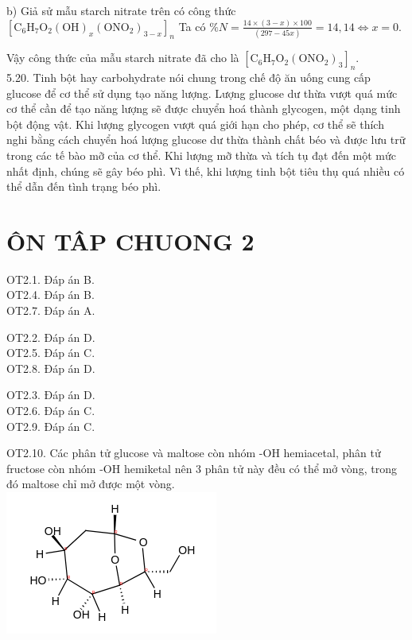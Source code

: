 \documentclass[10pt]{article}
\begin{document}
b) Giả sử mẫu starch nitrate trên có công thức $\left[\mathrm{C}_{6} \mathrm{H}_{7} \mathrm{O}_{2}(\mathrm{OH})_{x}\left(\mathrm{ONO}_{2}\right)_{3-x}\right]_{n}$ Ta có $\% N=\frac{14 \times(3-x) \times 100}{(297-45 x)}=14,14 \Leftrightarrow x=0$.

Vậy công thức của mẫu starch nitrate đã cho là $\left[\mathrm{C}_{6} \mathrm{H}_{7} \mathrm{O}_{2}\left(\mathrm{ONO}_{2}\right)_{3}\right]_{n}$.\\
5.20. Tinh bột hay carbohydrate nói chung trong chế độ ăn uống cung cấp glucose để cơ thể sử dụng tạo năng lượng. Lượng glucose dư thừa vượt quá mức cơ thể cần để tạo năng lượng sẽ được chuyển hoá thành glycogen, một dạng tinh bột động vật. Khi lượng glycogen vượt quá giới hạn cho phép, cơ thể sẽ thích nghi bằng cách chuyển hoá lượng glucose dư thừa thành chất béo và được lưu trữ trong các tế bào mỡ của cơ thể. Khi lượng mỡ thừa và tích tụ đạt đến một mức nhất định, chúng sẽ gây béo phì. Vì thế, khi lượng tinh bột tiêu thụ quá nhiều có thể dẫn đến tình trạng béo phì.

\section*{ÔN TÂP CHUONG 2}
OT2.1. Đáp án B.\\
OT2.4. Đáp án B.\\
OT2.7. Đáp án A.

OT2.2. Đáp án D.\\
OT2.5. Đáp án C.\\
OT2.8. Đáp án D.

OT2.3. Đáp án D.\\
OT2.6. Đáp án C.\\
OT2.9. Đáp án C.

OT2.10. Các phân tử glucose và maltose còn nhóm -OH hemiacetal, phân tử fructose còn nhóm -OH hemiketal nên 3 phân tử này đều có thể mở vòng, trong đó maltose chỉ mở được một vòng.\\
\includegraphics{smile-ade24bf49a121731ac8ea60c29d28fd1cfc54d9d}
\end{document}
